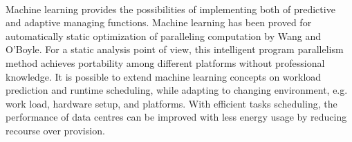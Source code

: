 \\
\linebreak
Machine learning provides the possibilities of implementing both of predictive and adaptive managing functions\cite{ma}. Machine learning has been proved for automatically static optimization of paralleling computation by Wang and O'Boyle\cite{wangf}\cite{wangs}. For a static analysis point of view, this intelligent program parallelism method achieves portability among different platforms without professional knowledge\cite{wangs}. It is possible to extend machine learning concepts on workload prediction and runtime scheduling, while adapting to changing environment, e.g. work load, hardware setup, and platforms. With efficient tasks scheduling, the performance of data centres can be improved with less energy usage by reducing recourse over provision.
